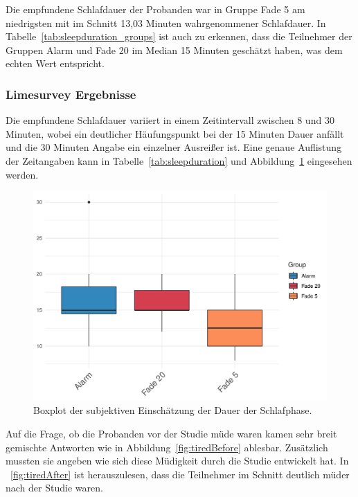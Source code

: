 Die empfundene Schlafdauer der Probanden war in Gruppe Fade 5 am niedrigsten mit im Schnitt 13,03 Minuten wahrgenommener Schlafdauer. In Tabelle~\ref{tab:sleepduration_groups} ist auch zu erkennen, dass die Teilnehmer der Gruppen Alarm und Fade 20 im Median 15 Minuten geschätzt haben, was dem echten Wert entspricht. 

\subsubsection{Limesurvey Ergebnisse}
Die empfundene Schlafdauer variiert in einem Zeitintervall zwischen 8 und 30 Minuten, wobei ein deutlicher Häufungspunkt bei der 15 Minuten Dauer anfällt und die 30 Minuten Angabe ein einzelner Ausreißer ist. Eine genaue Auflistung der Zeitangaben kann in Tabelle~\ref{tab:sleepduration} und Abbildung~\ref{fig:subjectiveSleepDuration} eingesehen werden.

\begin{figure}[H]
	\centering
	\includegraphics[width=\textwidth]{./_StudyResults/subjectiveSleepDuration}
	\caption{Boxplot der subjektiven Einschätzung der Dauer der Schlafphase.}
	\label{fig:subjectiveSleepDuration}
\end{figure}

Auf die Frage, ob die Probanden vor der Studie müde waren kamen sehr breit gemischte Antworten wie in Abbildung~\ref{fig:tiredBefore} ablesbar. Zusätzlich mussten sie angeben wie sich diese Müdigkeit durch die Studie entwickelt hat. In ~\ref{fig:tiredAfter} ist herauszulesen, dass die Teilnehmer im Schnitt deutlich müder nach der Studie waren.


